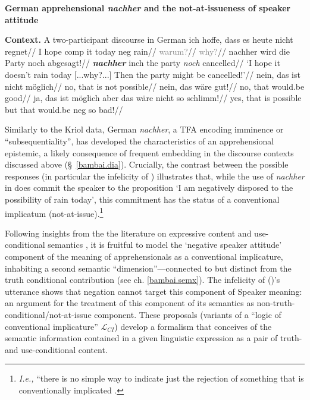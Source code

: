\pex[everylabel=\bf\sc,labelformat=A,interpartskip=0pt,*=$^\#$] 
\textbf{German apprehensional \textit{nachher} and the not-at-issueness of speaker attitude}

\textbf{Context.} A two-participant discourse in German
\a\begingl
\gla ich hoffe, dass es heute nicht regnet//
\glb I hope {\sc comp} it today {\sc neg} rain//
\endgl
\a 	\begingl\gla \textcolor{gray}{warum?}//
\glb \textcolor{gray}{why?}//
\endgl
\a[label=a$_2$]\begingl\gla nachher wird die Party noch abgesagt!//
\glb \textbf{\textit{nachher}} {\sc inch} the party \textit{noch} cancelled//
\glft`I hope it doesn't rain today [...why?...] Then the party might be \mbox{cancelled}!'//\endgl
\a[label=b$_2$]\begingl\gla nein, das ist nicht möglich//
\glb no, that is not possible//
\endgl
\a[label=b$^{\prime}_2$]\begingl\gla\ljudge{$^\#$}nein, das wäre gut!//
\glb no, that would.be good//
\endgl
\a[label=b$^{\prime\prime}_2$]\begingl\gla ja, das ist möglich aber das wäre nicht so schlimm!//
\glb yes, that is possible but that would.be {\sc neg} so bad!//
\endgl\xe


Similarly to the Kriol data, German \textit{nachher}, a TFA encoding imminence or ``subsequentiality'', has developed the characteristics of an apprehensional epistemic, a likely consequence of frequent embedding in the discourse contexts discussed above (\S~\ref{bambai.dia}). Crucially, the contrast between the possible responses (in particular the infelicity of ) illustrates that, while the use of \textit{nachher} in  does commit the speaker to the proposition `I am negatively disposed to the possibility of rain today', this commitment has the status of a conventional implicatum (not-at-issue).\footnote{\textit{I.e.,} ``there is no simple way to indicate just the rejection of something that is conventionally implicated \citep[14]{Karttunen1979}.}


Following insights from the the literature on expressive content and use-conditional semantics \citetext{\citealp[\textit{e.g.},][]{McCready2010,Kaplan1999,Potts2007,Gutzmann2015}, ostensibly developing \citeauthor{Karttunen1979}'s \citeyear{Karttunen1979} proposed extension to PTQ}, it is fruitful to model the `negative speaker attitude' component of the meaning of apprehensionals as a conventional implicature, inhabiting a second semantic ``dimension''---connected to but distinct from the truth conditional contribution (see ch. \ref{bambai.semx}). The infelicity of ()'s utterance shows that negation cannot target this component of Speaker meaning: an argument for the treatment of this component of its semantics as non-truth-conditional/not-at-issue component. These proposals (variants of a ``logic of conventional implicature'' $ \mathcal L_{CI} $) develop a formalism that conceives of the semantic information contained in a given linguistic expression as a pair of truth- and use-conditional content.





